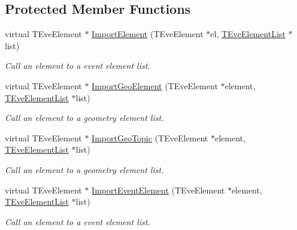 \subsection*{Protected Member Functions}
\begin{DoxyCompactItemize}
\item 
virtual T\+Eve\+Element $\ast$ \hyperlink{class_d_d4hep_1_1_projection_ad68a569fdc412f5ed8769e89df3dd821}{Import\+Element} (T\+Eve\+Element $\ast$el, \hyperlink{class_t_eve_element_list}{T\+Eve\+Element\+List} $\ast$list)
\begin{DoxyCompactList}\small\item\em Call an element to a event element list. \end{DoxyCompactList}\item 
virtual T\+Eve\+Element $\ast$ \hyperlink{class_d_d4hep_1_1_projection_a05c32084a42c00a366077acec5a55a82}{Import\+Geo\+Element} (T\+Eve\+Element $\ast$element, \hyperlink{class_t_eve_element_list}{T\+Eve\+Element\+List} $\ast$list)
\begin{DoxyCompactList}\small\item\em Call an element to a geometry element list. \end{DoxyCompactList}\item 
virtual T\+Eve\+Element $\ast$ \hyperlink{class_d_d4hep_1_1_projection_a97415addc63b3253bbccc3bcd0414c26}{Import\+Geo\+Topic} (T\+Eve\+Element $\ast$element, \hyperlink{class_t_eve_element_list}{T\+Eve\+Element\+List} $\ast$list)
\begin{DoxyCompactList}\small\item\em Call an element to a geometry element list. \end{DoxyCompactList}\item 
virtual T\+Eve\+Element $\ast$ \hyperlink{class_d_d4hep_1_1_projection_a63d20236b4b67710dcfb9904848465aa}{Import\+Event\+Element} (T\+Eve\+Element $\ast$element, \hyperlink{class_t_eve_element_list}{T\+Eve\+Element\+List} $\ast$list)
\begin{DoxyCompactList}\small\item\em Call an element to a event element list. \end{DoxyCompactList}\end{DoxyCompactItemize}
